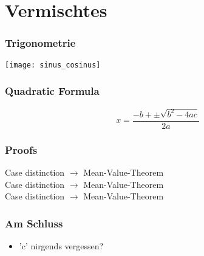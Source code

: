 \part{Vermischtes}
\setcounter{section}{0}

\section{Trigonometrie}
\texttt{[image: sinus\_cosinus]}

\section{Quadratic Formula}
\[ x = \frac{-b + \pm \sqrt{b^2 - 4 a c} }{2 a} \]

\section{Proofs}
\Beweis[$\sin(x) < x$] Case distinction $\rightarrow$ Mean-Value-Theorem \\

\Beweis[Fixpunkt 6.4a] Case distinction $\rightarrow$ Mean-Value-Theorem \\

 Case distinction $\rightarrow$ Mean-Value-Theorem

\section{Am Schluss}
\begin{itemize}
	\item 'c' nirgends vergessen?
\end{itemize}